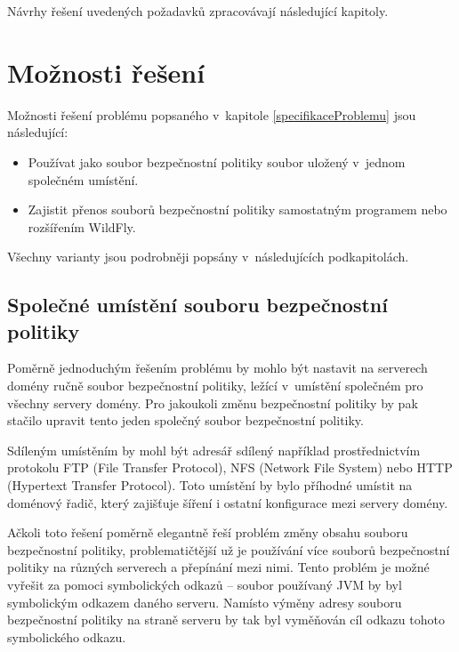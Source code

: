 Návrhy řešení uvedených požadavků zpracovávají následující kapitoly.

\section{Možnosti řešení} \label{vycetMoznostiReseni}

Možnosti řešení problému popsaného v~kapitole \ref{specifikaceProblemu} jsou následující:

\begin{itemize}
  \item Používat jako soubor bezpečnostní politiky soubor uložený v~jednom společném umístění.
  \item Zajistit přenos souborů bezpečnostní politiky samostatným programem nebo rozšířením WildFly.
\end{itemize}

Všechny varianty jsou podrobněji popsány v~následujících podkapitolách.

\subsection{Společné umístění souboru bezpečnostní politiky} \label{reseniSpolecne}

Poměrně jednoduchým řešením problému by mohlo být nastavit na serverech domény ručně soubor bezpečnostní politiky, ležící v~umístění společném pro všechny servery domény.
Pro jakoukoli změnu bezpečnostní politiky by pak stačilo upravit tento jeden společný soubor bezpečnostní politiky.

Sdíleným umístěním by mohl být adresář sdílený například prostřednictvím protokolu FTP (File Transfer Protocol), NFS (Network File System) nebo HTTP (Hypertext Transfer Protocol).
Toto umístění by bylo příhodné umístit na doménový řadič, který zajišťuje šíření i ostatní konfigurace mezi servery domény.

Ačkoli toto řešení poměrně elegantně řeší problém změny obsahu souboru bezpečnostní politiky, problematičtější už je používání více souborů bezpečnostní politiky na různých serverech a přepínání mezi nimi.
Tento problém je možné vyřešit za pomoci symbolických odkazů -- soubor používaný JVM by byl symbolickým odkazem daného serveru.
Namísto výměny adresy souboru bezpečnostní politiky na straně serveru by tak byl vyměňován cíl odkazu tohoto symbolického odkazu.

